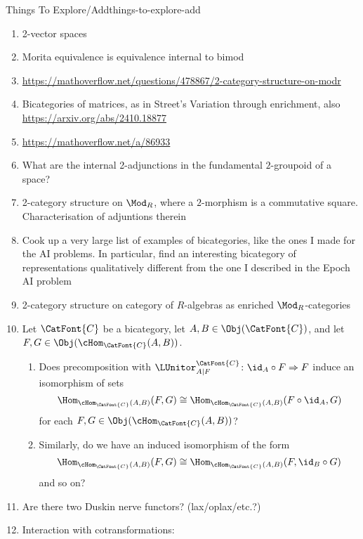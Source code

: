 \begin{remark}{Things To Explore/Add}{things-to-explore-add}
\begin{enumerate}
        \item 2-vector spaces
        \item Morita equivalence is equivalence internal to bimod
        \item \url{https://mathoverflow.net/questions/478867/2-category-structure-on-modr}
        \item Bicategories of matrices, as in Street's Variation through enrichment, also \url{https://arxiv.org/abs/2410.18877}
        \item \url{https://mathoverflow.net/a/86933}
        \item What are the internal 2-adjunctions in the fundamental $2$-groupoid of a space?
        \item 2-category structure on $\Mod_{R}$, where a $2$-morphism is a commutative square. Characterisation of adjuntions therein
        \item Cook up a very large list of examples of bicategories, like the ones I made for the AI problems. In particular, find an interesting bicategory of representations qualitatively different from the one I described in the Epoch AI problem
        \item 2-category structure on category of $R$-algebras as enriched $\Mod_{R}$-categories
        \item Let $\CatFont{C}$ be a bicategory, let $A,B\in\Obj(\CatFont{C})$, and let $F,G\in\Obj(\cHom_{\CatFont{C}}(A,B))$.
            \begin{enumerate}
                \item Does precomposition with $\LUnitor^{\CatFont{C}}_{A|F}\colon\id_{A}\circ F\Rightarrow F$ induce an isomorphism of sets
                    \[
                        \Hom_{\cHom_{\CatFont{C}}(A,B)}(F,G)%
                        \cong%
                        \Hom_{\cHom_{\CatFont{C}}(A,B)}(F\circ\id_{A},G)%
                    \]%
                    for each $F,G\in\Obj(\cHom_{\CatFont{C}}(A,B))$?
                \item Similarly, do we have an induced isomorphism of the form
                    \[
                        \Hom_{\cHom_{\CatFont{C}}(A,B)}(F,G)%
                        \cong%
                        \Hom_{\cHom_{\CatFont{C}}(A,B)}(F,\id_{B}\circ G)%
                    \]%
                    and so on?
            \end{enumerate}
        \item Are there two Duskin nerve functors? (lax/oplax/etc.?)
        \item Interaction with cotransformations:

\end{enumerate}
\end{remark}
